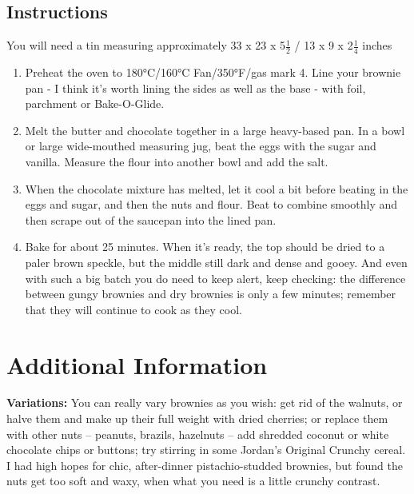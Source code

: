 \documentclass{article}
\begin{document}
        \subsection{Instructions}
            You will need a tin measuring approximately 33 x 23 x 5$\frac{1}{2}$ / 13 x 9 x 2$\frac{1}{4}$ inches
            \begin{enumerate}            
                \item Preheat the oven to 180°C/160°C Fan/350°F/gas mark 4. Line your brownie pan - I think it's worth lining the sides as well as the base - with foil, parchment or Bake-O-Glide. 
                \item Melt the butter and chocolate together in a large heavy-based pan. In a bowl or large wide-mouthed measuring jug, beat the eggs with the sugar and vanilla. Measure the flour into another bowl and add the salt. 
                \item When the chocolate mixture has melted, let it cool a bit before beating in the eggs and sugar, and then the nuts and flour. Beat to combine smoothly and then scrape out of the saucepan into the lined pan. 
                \item Bake for about 25 minutes. When it's ready, the top should be dried to a paler brown speckle, but the middle still dark and dense and gooey. And even with such a big batch you do need to keep alert, keep checking: the difference between gungy brownies and dry brownies is only a few minutes; remember that they will continue to cook as they cool.
            \end{enumerate}           
    \section{Additional Information}
            {\bfseries \large Variations:   }
                You can really vary brownies as you wish: get rid of the walnuts, or halve them and make up their full weight with dried cherries; or replace them with other nuts – peanuts, brazils, hazelnuts – add shredded coconut or white chocolate chips or buttons; try stirring in some Jordan’s Original Crunchy cereal. I had high hopes for chic, after-dinner pistachio-studded brownies, but found the nuts get too soft and waxy, when what you need is a little crunchy contrast.
\end{document}
